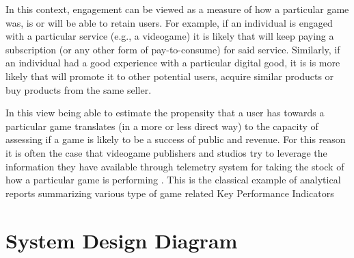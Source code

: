 In this context, engagement can be viewed as a measure of how a particular game was, is or will be able to retain users. For example, if an individual is engaged with a particular service (e.g., a videogame) it is likely that will keep paying a subscription (or any other form of pay-to-consume) for said service. Similarly, if an individual had a good experience with a particular digital good, it is is more likely that will promote it to other potential users, acquire similar products or buy products from the same seller.  

In this view being able to estimate the propensity that a user has towards a particular game translates (in a more or less direct way) to the capacity of assessing if a game is likely to be a success of public and revenue. For this reason it is often the case that videogame publishers and studios try to leverage the information they have available through telemetry system for taking the stock of how a particular game is performing \cite{el2016game}. This is the classical example of analytical reports summarizing various type of game related Key Performance Indicators \cite{el2016game} 

\section{System Design Diagram}
\label{pipeline}


